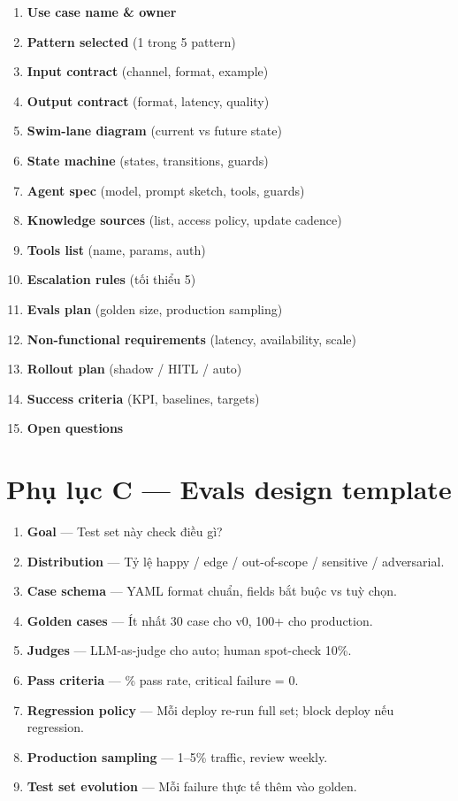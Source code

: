 \documentclass[11pt,a4paper]{article}
\begin{document}
\begin{enumerate}
\item \textbf{Use case name \& owner}
\item \textbf{Pattern selected} (1 trong 5 pattern)
\item \textbf{Input contract} (channel, format, example)
\item \textbf{Output contract} (format, latency, quality)
\item \textbf{Swim-lane diagram} (current vs future state)
\item \textbf{State machine} (states, transitions, guards)
\item \textbf{Agent spec} (model, prompt sketch, tools, guards)
\item \textbf{Knowledge sources} (list, access policy, update cadence)
\item \textbf{Tools list} (name, params, auth)
\item \textbf{Escalation rules} (tối thiểu 5)
\item \textbf{Evals plan} (golden size, production sampling)
\item \textbf{Non-functional requirements} (latency, availability, scale)
\item \textbf{Rollout plan} (shadow / HITL / auto)
\item \textbf{Success criteria} (KPI, baselines, targets)
\item \textbf{Open questions}
\end{enumerate}

\section*{Phụ lục C — Evals design template}

\begin{enumerate}
\item \textbf{Goal} --- Test set này check điều gì?
\item \textbf{Distribution} --- Tỷ lệ happy / edge / out-of-scope / sensitive / adversarial.
\item \textbf{Case schema} --- YAML format chuẩn, fields bắt buộc vs tuỳ chọn.
\item \textbf{Golden cases} --- Ít nhất 30 case cho v0, 100+ cho production.
\item \textbf{Judges} --- LLM-as-judge cho auto; human spot-check 10\%.
\item \textbf{Pass criteria} --- \% pass rate, critical failure = 0.
\item \textbf{Regression policy} --- Mỗi deploy re-run full set; block deploy nếu regression.
\item \textbf{Production sampling} --- 1--5\% traffic, review weekly.
\item \textbf{Test set evolution} --- Mỗi failure thực tế thêm vào golden.
\end{enumerate}
\end{document}
